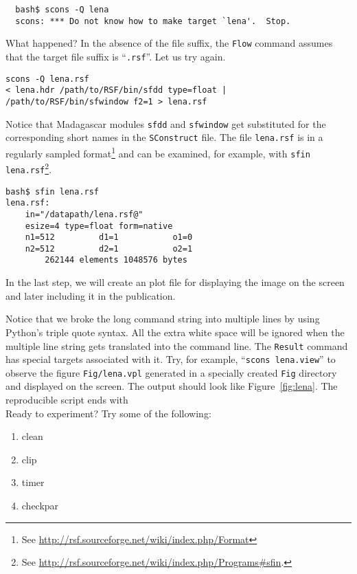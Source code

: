 
%
\begin{verbatim}
  bash$ scons -Q lena
  scons: *** Do not know how to make target `lena'.  Stop.
\end{verbatim}
What happened? In the absence of the file suffix, the \texttt{Flow}
command assumes that the target file suffix is ``\texttt{.rsf}''. Let us try again.
\begin{verbatim}
scons -Q lena.rsf
< lena.hdr /path/to/RSF/bin/sfdd type=float | /path/to/RSF/bin/sfwindow f2=1 > lena.rsf
\end{verbatim}
Notice that Madagascar modules \texttt{sfdd} and \texttt{sfwindow} get
substituted for the corresponding short names in the
\texttt{SConstruct} file. The file \texttt{lena.rsf} is in a regularly
sampled format\footnote{See
\url{http://rsf.sourceforge.net/wiki/index.php/Format}} and can be
examined, for example, with \texttt{sfin lena.rsf}\footnote{See
\url{http://rsf.sourceforge.net/wiki/index.php/Programs\#sfin}.}.
\begin{verbatim}
bash$ sfin lena.rsf
lena.rsf:
    in="/datapath/lena.rsf@"
    esize=4 type=float form=native
    n1=512         d1=1           o1=0
    n2=512         d2=1           o2=1
        262144 elements 1048576 bytes
\end{verbatim}
In the last step, we will create an plot file for displaying the image
on the screen and later including it in the publication.
%

%
Notice that we broke the long command string into multiple lines by
using Python's triple quote syntax. All the extra white space will be
ignored when the multiple line string gets translated into the command
line.  The \texttt{Result} command has special targets associated with
it. Try, for example, ``\texttt{scons lena.view}'' to observe the
figure \texttt{Fig/lena.vpl} generated in a specially created
\texttt{Fig} directory and displayed on the screen. The output should
look like Figure~\ref{fig:lena}.
%
%
The reproducible script ends with\\
%


Ready to experiment? Try some of the following:
\begin{enumerate}
\item clean
\item clip
\item timer 
\item checkpar
\end{enumerate}

